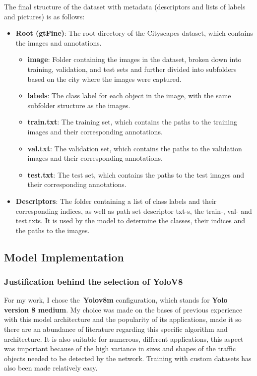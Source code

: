 The final structure of the dataset with metadata (descriptors and lists of labels and pictures) is as follows:
\begin{itemize}
    \item \textbf{Root (gtFine)}: The root directory of the Cityscapes dataset, which contains the images and annotations.
    \begin{itemize}
        \item \textbf{image}: Folder containing the images in the dataset, broken down into training, validation, and test sets
    and further divided into subfolders based on the city where the images were captured.
        \item \textbf{labels}: The class label for each object in the image, with the same subfolder structure as the images.
        \item \textbf{train.txt}: The training set, which contains the paths to the training images and their corresponding annotations.
        \item \textbf{val.txt}: The validation set, which contains the paths to the validation images and their corresponding annotations.
        \item \textbf{test.txt}: The test set, which contains the paths to the test images and their corresponding annotations.
    \end{itemize}
    \item \textbf{Descriptors}: The folder containing a list of class labels and their corresponding indices, as well as
    path set descriptor txt-s, the train-, val- and test.txts.
    It is used by the model to determine the classes, their indices and the paths to the images.
\end{itemize}


\subsection{Model Implementation}\label{subsec:model-implementation}


\subsubsection{Justification behind the selection of YoloV8}\label{subsubsec:justification-behind-the-selection-of-yolov8}


For my work, I chose the~\textbf{Yolov8m} configuration, which stands for \textbf{Yolo version 8 medium}.
My choice was made on the bases of previous experience with this model architecture and the popularity of its applications,
made it so there are an abundance of literature regarding this specific algorithm and architecture.
It is also suitable for numerous, different applications, this aspect was important because of the high variance in sizes and shapes of the traffic objects needed to be detected by the network.
Training with custom datasets has also been made relatively easy.

